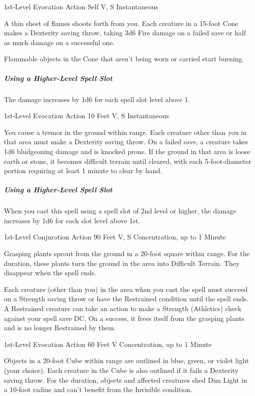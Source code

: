 \documentclass[letterpaper,openany,oneside,twocolumn]{book}
\begin{document}
	{1st-Level Evocation}
	{Action}
	{Self}
	{V, S}
	{Instantaneous}

A thin sheet of flames shoots forth from you. Each creature in a 15-foot Cone makes a Dexterity saving throw, taking 3d6 Fire damage on a failed save or half as much damage on a successful one.

Flammable objects in the Cone that aren't being worn or carried start burning.

\subparagraph*{Using a Higher-Level Spell Slot} The damage increases by 1d6 for each spell slot level above 1.

	{1st-Level Evocation}
	{Action}
	{10 Feet}
	{V, S}
	{Instantaneous}

You cause a tremor in the ground within range. Each creature other than you in that area must make a Dexterity saving throw. On a failed save, a creature takes 1d6 bludgeoning damage and is knocked prone. If the ground in that area is loose earth or stone, it becomes difficult terrain until cleared, with each 5-foot-diameter portion requiring at least 1 minute to clear by hand.

\subparagraph*{Using a Higher-Level Spell Slot} When you cast this spell using a spell slot of 2nd level or higher, the damage increases by 1d6 for each slot level above 1st.

	{1st-Level Conjuration}
	{Action}
	{90 Feet}
	{V, S}
	{Concentration, up to 1 Minute}

Grasping plants sprout from the ground in a 20-foot square within range. For the duration, these plants turn the ground in the area into Difficult Terrain. They disappear when the spell ends.

Each creature (other than you) in the area when you cast the spell must succeed on a Strength saving throw or have the Restrained condition until the spell ends. A Restrained creature can take an action to make a Strength (Athletics) check against your spell save DC. On a success, it frees itself from the grasping plants and is no longer Restrained by them.

	{1st-Level Evocation}
	{Action}
	{60 Feet}
	{V}
	{Concentration, up to 1 Minute}

Objects in a 20-foot Cube within range are outlined in blue, green, or violet light (your choice). Each creature in the Cube is also outlined if it fails a Dexterity saving throw. For the duration, objects and affected creatures shed Dim Light in a 10-foot radius and can't benefit from the Invisible condition.
\end{document}
